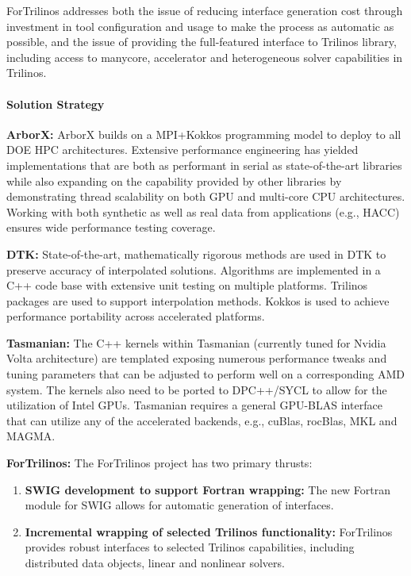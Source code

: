 ForTrilinos addresses both the issue of reducing interface generation cost
through investment in tool configuration and usage to make the process as
automatic as possible, and the issue of providing the full-featured interface to
Trilinos library, including access to manycore, accelerator and heterogeneous
solver capabilities in Trilinos.


\paragraph{Solution Strategy}

\nobreak


\indent

{\bf ArborX:} ArborX builds on a MPI+Kokkos programming model to deploy to all
DOE HPC architectures. Extensive performance engineering has yielded
implementations that are both as performant in serial as state-of-the-art
libraries while also expanding on the capability provided by other libraries by
demonstrating thread scalability on both GPU and multi-core CPU architectures.
Working with both synthetic as well as real data from applications (e.g., HACC)
ensures wide performance testing coverage.

{\bf DTK:} State-of-the-art, mathematically rigorous methods are used in DTK
to preserve accuracy of interpolated solutions.  Algorithms are implemented in
a C++ code base with extensive unit testing on multiple platforms.  Trilinos
packages are used to support interpolation methods.  Kokkos is used to achieve
performance portability across accelerated platforms.

{\bf Tasmanian:} The C++ kernels within Tasmanian (currently tuned for Nvidia
Volta architecture) are templated exposing numerous performance tweaks and
tuning parameters that can be adjusted to perform well on a corresponding AMD
system.
The kernels also need to be ported to DPC++/SYCL to allow for the utilization
of Intel GPUs. Tasmanian requires a general GPU-BLAS interface that can
utilize any of the accelerated backends, e.g., cuBlas, rocBlas, MKL and MAGMA.

{\bf ForTrilinos:}
The ForTrilinos project has two primary thrusts: \begin{enumerate} \item
    \textbf{SWIG development to support Fortran wrapping:} The new Fortran
  module for SWIG allows for automatic generation of interfaces.  \item
    \textbf{Incremental wrapping of selected Trilinos functionality:}
    ForTrilinos provides robust interfaces to selected Trilinos capabilities,
    including distributed data objects, linear and nonlinear solvers.
\end{enumerate}

